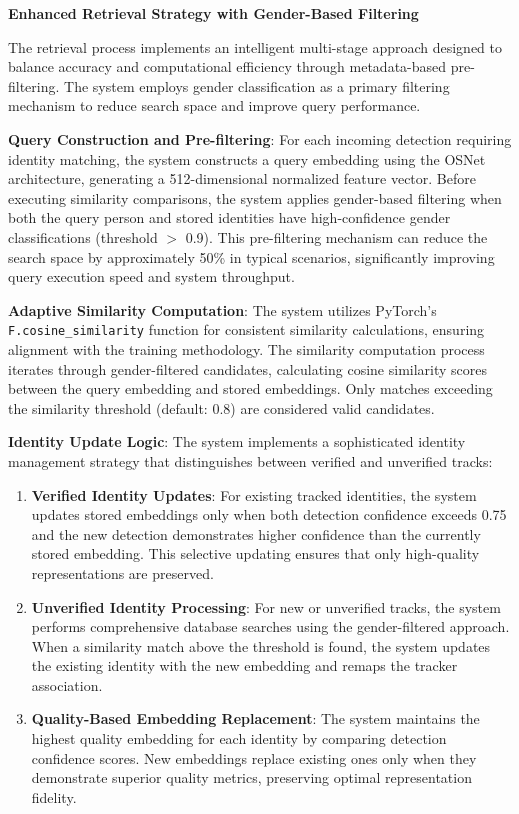 \textbf{Enhanced Retrieval Strategy with Gender-Based Filtering}

The retrieval process implements an intelligent multi-stage approach designed to balance accuracy and computational efficiency through metadata-based pre-filtering. The system employs gender classification as a primary filtering mechanism to reduce search space and improve query performance.

\textbf{Query Construction and Pre-filtering}: For each incoming detection requiring identity matching, the system constructs a query embedding using the OSNet architecture, generating a 512-dimensional normalized feature vector. Before executing similarity comparisons, the system applies gender-based filtering when both the query person and stored identities have high-confidence gender classifications (threshold $>$ 0.9). This pre-filtering mechanism can reduce the search space by approximately 50\% in typical scenarios, significantly improving query execution speed and system throughput.

\textbf{Adaptive Similarity Computation}: The system utilizes PyTorch's\\ \texttt{F.cosine\_similarity} function for consistent similarity calculations, ensuring alignment with the training methodology. The similarity computation process iterates through gender-filtered candidates, calculating cosine similarity scores between the query embedding and stored embeddings. Only matches exceeding the similarity threshold (default: 0.8) are considered valid candidates.

\textbf{Identity Update Logic}: The system implements a sophisticated identity management strategy that distinguishes between verified and unverified tracks:

\begin{enumerate}
   \item \textbf{Verified Identity Updates}: For existing tracked identities, the system updates stored embeddings only when both detection confidence exceeds 0.75 and the new detection demonstrates higher confidence than the currently stored embedding. This selective updating ensures that only high-quality representations are preserved.
   \item \textbf{Unverified Identity Processing}: For new or unverified tracks, the system performs comprehensive database searches using the gender-filtered approach. When a similarity match above the threshold is found, the system updates the existing identity with the new embedding and remaps the tracker association.
   \item \textbf{Quality-Based Embedding Replacement}: The system maintains the highest quality embedding for each identity by comparing detection confidence scores. New embeddings replace existing ones only when they demonstrate superior quality metrics, preserving optimal representation fidelity.
\end{enumerate}

